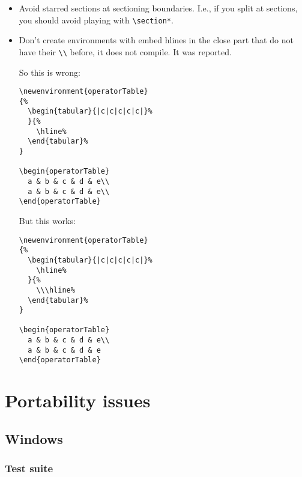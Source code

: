 \documentclass[openright,twoside,11pt]{book}
\begin{document}
\begin{itemize}
\item Avoid starred sections at sectioning boundaries.  I.e., if you
  split at sections, you should avoid playing with
  \lstinline|\section*|.

\item Don't create environments with embed hlines in the close part
  that do not have their \lstinline|\\| before, it does not compile.
  It was reported.

  So this is wrong:
\begin{lstlisting}[language={[LaTeX]TeX}]
\newenvironment{operatorTable}
{%
  \begin{tabular}{|c|c|c|c|c|}%
  }{%
    \hline%
  \end{tabular}%
}

\begin{operatorTable}
  a & b & c & d & e\\
  a & b & c & d & e\\
\end{operatorTable}
\end{lstlisting}

  But this works:
\begin{lstlisting}[language={[LaTeX]TeX}]
\newenvironment{operatorTable}
{%
  \begin{tabular}{|c|c|c|c|c|}%
    \hline%
  }{%
    \\\hline%
  \end{tabular}%
}

\begin{operatorTable}
  a & b & c & d & e\\
  a & b & c & d & e
\end{operatorTable}
\end{lstlisting}
\end{itemize}

\chapter{Portability issues}

\section{Windows}

\subsection{Test suite}
\end{document}
